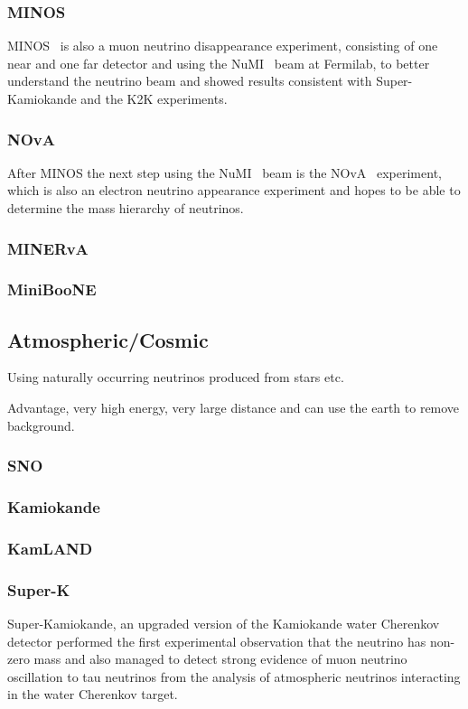 \subsubsection{MINOS}
MINOS~\cite{MINOS} is also a muon neutrino disappearance experiment, consisting of one near and one far detector and using the NuMI~\cite{19NuMI} beam at Fermilab, to better understand the neutrino beam and showed results consistent with Super-Kamiokande and the K2K experiments.
\subsubsection{NOvA}
After MINOS the next step using the NuMI~\cite{19NuMI} beam is the NOvA~\cite{18nova} experiment, which is also an electron neutrino appearance experiment and hopes to be able to determine the mass hierarchy of neutrinos.
\subsubsection{MINERvA}
\subsubsection{MiniBooNE}

\subsection{Atmospheric/Cosmic}
Using naturally occurring neutrinos produced from stars etc.

Advantage, very high energy, very large distance and can use the earth to remove background.

\subsubsection{SNO}
\subsubsection{Kamiokande}
\subsubsection{KamLAND}
\subsubsection{Super-K}
Super-Kamiokande\cite{20SUPERK}, an upgraded version of the Kamiokande water Cherenkov detector performed the first experimental observation that the neutrino has non-zero mass\cite{10Fukuda} and also managed to detect strong evidence of muon neutrino oscillation to tau neutrinos from the analysis of atmospheric neutrinos interacting in the water Cherenkov target.
